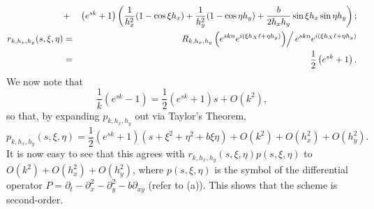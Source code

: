 \documentclass{article}
\begin{document}
\begin{enumerate}
\begin{enumerate}
\begin{eqnarray*}
& + & \left( e^{sk} + 1 \right) \left( \frac{1}{h_x^2} (1 - \cos \xi h_x)
                                     + \frac{1}{h_y^2} (1 - \cos \eta h_y)
                                     + \frac{b}{2h_xh_y} \sin \xi h_x \sin \eta h_y \right); \\
r_{k,h_x,h_y}(s,\xi,\eta)
& = & \left. R_{k,h_x,h_y} \left( e^{skn} e^{i(\xi h_X\ell + \eta h_y)} \right) \right/ e^{skn} e^{i(\xi h_X\ell + \eta h_y)} \\
& = & \frac{1}{2} \left( e^{sk} + 1 \right).
\end{eqnarray*}
We now note that
\[\frac{1}{k} \left( e^{sk} - 1 \right)
  = \frac{1}{2} \left( e^{sk} + 1 \right) s + O(k^2),\]
so that, by expanding \(p_{k,h_x,h_y}\) out via Taylor's Theorem,
\[p_{k,h_x,h_y}(s,\xi,\eta)
  = \frac{1}{2} \left( e^{sk} + 1 \right) \left( s + \xi^2 + \eta^2 + b\xi\eta \right) + O(k^2) + O(h_x^2) + O(h_y^2).\]
It is now easy to see that this agrees with \(r_{k,h_x,h_y}(s,\xi,\eta) p(s,\xi,\eta)\) to \(O(k^2) + O(h_x^2) + O(h_y^2)\), where \(p(s,\xi,\eta)\) is the symbol of the differential operator \(P = \partial_t - \partial_x^2 - \partial_y^2 - b\partial_{xy}\) (refer to (a)).  This shows that the scheme is second-order.


\end{enumerate}
\end{enumerate}
\end{document}
